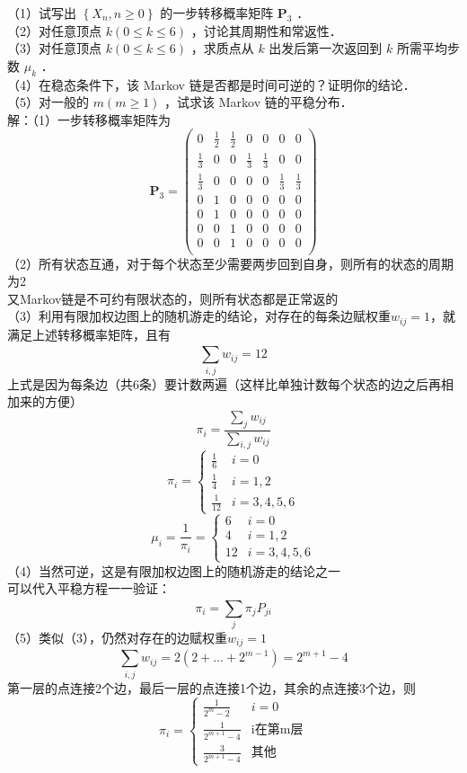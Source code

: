 \documentclass[UTF8,openany]{book}
\begin{document}
\noindent （1）试写出 $\left\{X_{n}, n \geq 0\right\}$ 的一步转移概率矩阵 $\bm{P}_3$ ．\\
（2）对任意顶点 $k(0 \leq k \leq 6)$ ，讨论其周期性和常返性．\\
（3）对任意顶点 $k(0 \leq k \leq 6)$ ，求质点从 $k$ 出发后第一次返回到 $k$ 所需平均步数 $\mu_{k}$ ．\\
（4）在稳态条件下，该 Markov 链是否都是时间可逆的？证明你的结论．\\
（5）对一般的 $m(m \geq 1)$ ，试求该 Markov 链的平稳分布．\\
解：（1）一步转移概率矩阵为
\[
\bm{P}_3=
\begin{pmatrix}
	0 & \frac{1}{2} &\frac{1}{2} & 0 &0 &0&0\\
	\frac{1}{3} & 0&0 & \frac{1}{3} &\frac{1}{3} &0&0\\
	\frac{1}{3} & 0&0 & 0 &0 &\frac{1}{3}&\frac{1}{3}\\
	0 & 1 &0 & 0 &0 &0&0\\
	0 & 1 &0 & 0 &0 &0&0\\
	0 & 0&1 & 0 &0 &0&0\\
	0 & 0&1 & 0 &0 &0&0\\
\end{pmatrix}
\]
（2）所有状态互通，对于每个状态至少需要两步回到自身，则所有的状态的周期为2\\
又Markov链是不可约有限状态的，则所有状态都是正常返的\\
（3）利用有限加权边图上的随机游走的结论，对存在的每条边赋权重$w_{ij}=1$，就满足上述转移概率矩阵，且有\\
\[
\sum\limits_{i,j}^{} w_{ij}=12
\]
上式是因为每条边（共6条）要计数两遍（这样比单独计数每个状态的边之后再相加来的方便）\\
\[
\pi_i=\frac{\sum\limits_{j}^{} w_{ij}}{\sum\limits_{i,j}^{} w_{ij}}
\]
\[
\pi_i=
\begin{cases}
	\frac{1}{6}  &  i=0 \\
	\frac{1}{4} &  i=1,2\\
	\frac{1}{12} & i=3,4,5,6
\end{cases}
\]
\[
\mu_i=\frac{1}{\pi_i}=
\begin{cases}
	6  &  i=0 \\
	4 &  i=1,2\\
	12 & i=3,4,5,6
\end{cases}
\]
（4）当然可逆，这是有限加权边图上的随机游走的结论之一\\
可以代入平稳方程一一验证：\\
\[
\pi_i=\sum\limits_{j}^{} \pi_j P_{ji}
\]
（5）类似（3），仍然对存在的边赋权重$w_{ij}=1$\\
\[
\sum\limits_{i,j}^{} w_{ij}=2(2+\dots+2^{m-1})=2^{m+1}-4
\]
第一层的点连接2个边，最后一层的点连接1个边，其余的点连接3个边，则\\
\[
\pi_i=
\begin{cases}
	\frac{1}{2^m-2}  &  i=0 \\
	\frac{1}{2^{m+1}-4} &  \text{i在第m层}\\
	\frac{3}{2^{m+1}-4} & \text{其他}
\end{cases}
\]\\
\end{document}
